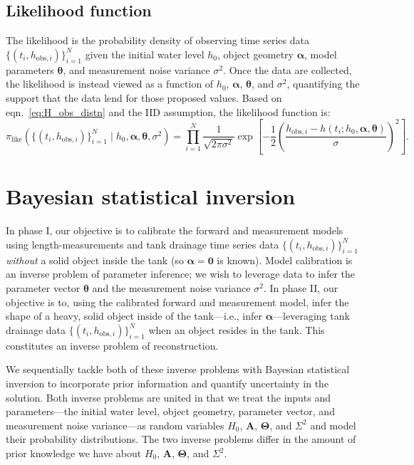 \documentclass[openacc]{rsproca_new}%
\newcommand\thedata {$\{(t_i,h_{\text{obs}, i})\}_{i=1}^{N}$\xspace}
\newcommand\thedatanomath {\{(t_i,h_{\text{obs}, i})\}_{i=1}^{N}}
\begin{document}
\subsection{Likelihood function}
The likelihood is the probability density of observing time series data \thedata given the initial water level $h_0$, object geometry $\boldsymbol \alpha$, model parameters $\boldsymbol \theta$, and measurement noise variance $\sigma^2$. Once the data are collected, the likelihood is instead viewed as a function of $h_0$, $\boldsymbol \alpha$, $\boldsymbol \theta$, and $\sigma^2$, quantifying the support that the data lend for those proposed values. Based on eqn.~\ref{eq:H_obs_distn} and the IID assumption, the likelihood function is:
\begin{equation}
 \pi_{\text{like}}(\thedatanomath \mid h_0,\boldsymbol  \alpha, \boldsymbol \theta, \sigma^2 ) = \prod_{i=1}^N \frac{1}{\sqrt{2\pi\sigma^2}} \exp \left[-\frac{1}{2}\left(\frac{h_{\text{obs}, i} - h(t_i; h_0, \boldsymbol\alpha, \boldsymbol\theta)}{\sigma} \right)^2 \right]. \label{eq:like}
\end{equation}

\section{Bayesian statistical inversion} \label{sec:bsi}
In phase I, our objective is to calibrate the forward and measurement models using length-measurements and tank drainage time series data \thedata \emph{without} a solid object inside the tank (so $\boldsymbol \alpha=\mathbf{0}$ is known).
Model calibration is an inverse problem of parameter inference; we wish to leverage data to infer the parameter vector $\boldsymbol \theta$ and the measurement noise variance $\sigma^2$. 
In phase II, our objective is to, using the calibrated forward and measurement model, infer the shape of a heavy, solid object inside of the tank---i.e., infer $\boldsymbol \alpha$---leveraging tank drainage data \thedata when an object resides in the tank. This constitutes an inverse problem of reconstruction. 

We sequentially tackle both of these inverse problems with Bayesian statistical inversion \cite{calvetti2018inverse,waqar2023tutorial,kaipio2006statistical,dashti2013bayesian} to incorporate prior information and quantify uncertainty in the solution. 
Both inverse problems are united in that we treat the inputs and parameters---the initial water level, object geometry, parameter vector, and measurement noise variance---as random variables $H_0$, $\boldsymbol A$, $\boldsymbol \Theta$, and $\Sigma^2$ and model their probability distributions. The two inverse problems differ in the amount of prior knowledge we have about $H_0$, $\boldsymbol A$, $\boldsymbol \Theta$, and $\Sigma^2$.
\end{document}
